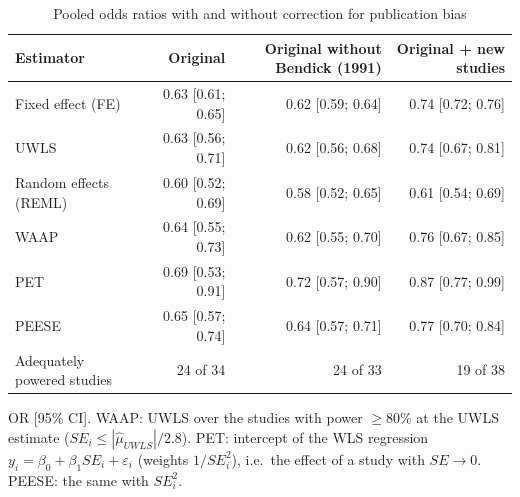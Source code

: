 \begin{table}[htbp]
\centering
\small
\caption{Pooled odds ratios with and without correction for publication bias}
\label{tab:pubbias-estimates}
\begin{tabular}{lrrr}
\toprule
Estimator & Original & Original without Bendick (1991) & Original + new studies \\
\midrule
Fixed effect (FE) & 0.63 [0.61; 0.65] & 0.62 [0.59; 0.64] & 0.74 [0.72; 0.76] \\
UWLS & 0.63 [0.56; 0.71] & 0.62 [0.56; 0.68] & 0.74 [0.67; 0.81] \\
Random effects (REML) & 0.60 [0.52; 0.69] & 0.58 [0.52; 0.65] & 0.61 [0.54; 0.69] \\
WAAP & 0.64 [0.55; 0.73] & 0.62 [0.55; 0.70] & 0.76 [0.67; 0.85] \\
PET & 0.69 [0.53; 0.91] & 0.72 [0.57; 0.90] & 0.87 [0.77; 0.99] \\
PEESE & 0.65 [0.57; 0.74] & 0.64 [0.57; 0.71] & 0.77 [0.70; 0.84] \\
Adequately powered studies & 24 of 34 & 24 of 33 & 19 of 38 \\
\bottomrule
\end{tabular}
\par\smallskip\parbox{0.95\linewidth}{\footnotesize OR [95\% CI]. WAAP: UWLS over the studies with power $\geq 80\%$ at the UWLS estimate ($SE_i \leq |\hat\mu_{UWLS}|/2.8$). PET: intercept of the WLS regression $y_i = \beta_0 + \beta_1 SE_i + \varepsilon_i$ (weights $1/SE_i^2$), i.e.\ the effect of a study with $SE \to 0$. PEESE: the same with $SE_i^2$.}
\end{table}
